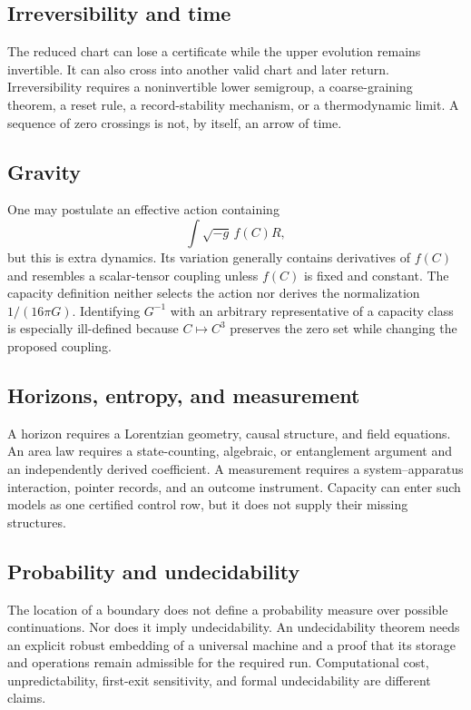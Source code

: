\documentclass[11pt]{article}
\theoremstyle{definition}
\theoremstyle{remark}
\begin{document}
\subsection{Irreversibility and time}

The reduced chart can lose a certificate while the upper evolution remains
invertible.  It can also cross into another valid chart and later return.
Irreversibility requires a noninvertible lower semigroup, a coarse-graining
theorem, a reset rule, a record-stability mechanism, or a thermodynamic
limit.  A sequence of zero crossings is not, by itself, an arrow of time.

\subsection{Gravity}

One may postulate an effective action containing
\[
 \int\sqrt{-g}\,f(C)R,
\]
but this is extra dynamics.  Its variation generally contains derivatives
of \(f(C)\) and resembles a scalar-tensor coupling unless \(f(C)\) is fixed
and constant.  The capacity definition neither selects the action nor
derives the normalization \(1/(16\pi G)\).  Identifying
\(G^{-1}\) with an arbitrary representative of a capacity class is
especially ill-defined because \(C\mapsto C^3\) preserves the zero set while
changing the proposed coupling.

\subsection{Horizons, entropy, and measurement}

A horizon requires a Lorentzian geometry, causal structure, and field
equations.  An area law requires a state-counting, algebraic, or
entanglement argument and an independently derived coefficient.  A
measurement requires a system--apparatus interaction, pointer records, and
an outcome instrument.  Capacity can enter such models as one certified
control row, but it does not supply their missing structures.

\subsection{Probability and undecidability}

The location of a boundary does not define a probability measure over
possible continuations.  Nor does it imply undecidability.  An
undecidability theorem needs an explicit robust embedding of a universal
machine and a proof that its storage and operations remain admissible for
the required run.  Computational cost, unpredictability, first-exit
sensitivity, and formal undecidability are different claims.
\end{document}
